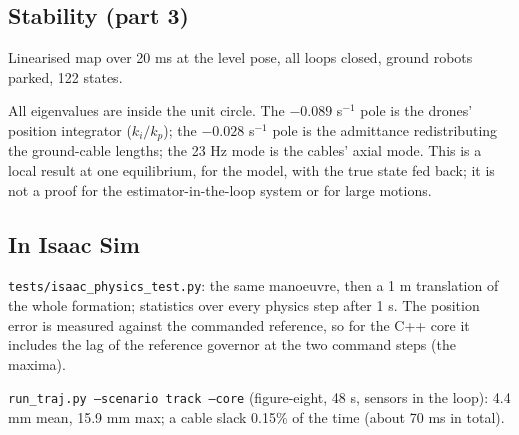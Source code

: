\subsection{Stability (part 3)}
Linearised map over 20 ms at the level pose, all loops closed, ground robots parked, 122 states.
\begin{center}\end{center}
All eigenvalues are inside the unit circle. The $-0.089$ s$^{-1}$ pole is the drones' position integrator
($k_i/k_p$); the $-0.028$ s$^{-1}$ pole is the admittance redistributing the ground-cable lengths; the 23 Hz mode
is the cables' axial mode. This is a local result at one equilibrium, for the model, with the true state fed
back; it is not a proof for the estimator-in-the-loop system or for large motions.

\subsection{In Isaac Sim}
\texttt{tests/isaac\_physics\_test.py}: the same manoeuvre, then a 1 m translation of the whole formation;
statistics over every physics step after 1 s. The position error is measured against the commanded reference,
so for the C++ core it includes the lag of the reference governor at the two command steps (the maxima).
\begin{center}\end{center}
\texttt{run\_traj.py --scenario track --core} (figure-eight, 48 s, sensors in the loop): 4.4 mm mean, 15.9 mm max;
a cable slack 0.15\% of the time (about 70 ms in total).

